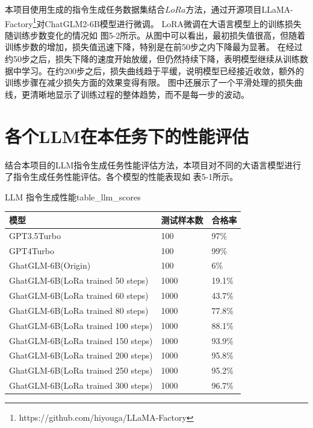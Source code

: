 \documentclass[a4paper,AutoFakeBold,oneside,12pt]{book}
\begin{document}
本项目使用生成的指令生成任务数据集结合$LoRa$方法，通过开源项目LLaMA-Factory\footnote{https://github.com/hiyouga/LLaMA-Factory}对ChatGLM2-6B模型进行微调。
LoRA微调在大语言模型上的训练损失随训练步数变化的情况如 图5-2所示。从图中可以看出，最初损失值很高，但随着训练步数的增加，损失值迅速下降，特别是在前50步之内下降最为显著。
在经过约50步之后，损失下降的速度开始放缓，但仍然持续下降，表明模型继续从训练数据中学习。在约200步之后，损失曲线趋于平缓，说明模型已经接近收敛，额外的训练步骤在减少损失方面的效果变得有限。
图中还展示了一个平滑处理的损失曲线，更清晰地显示了训练过程的整体趋势，而不是每一步的波动。

\section{各个LLM在本任务下的性能评估}
结合本项目的LLM指令生成任务性能评估方法，本项目对不同的大语言模型进行了指令生成任务性能评估。各个模型的性能表现如 表5-1所示。
\begin{bupttable}{LLM 指令生成性能}{table_llm_scores}
    \begin{tabular}{|l|l|l|}
        \hline \textbf{模型} & \textbf{测试样本数} & \textbf{合格率} \\
        \hline GPT3.5Turbo & 100 & 97\% \\
        \hline GPT4Turbo & 100 & 99\% \\
        \hline GhatGLM-6B(Origin) & 100 & 6\% \\
        \hline GhatGLM-6B(LoRa trained 50 steps) & 1000 & 19.1\% \\
        \hline GhatGLM-6B(LoRa trained 60 steps) & 1000 & 43.7\% \\
        \hline GhatGLM-6B(LoRa trained 80 steps) & 1000 & 77.8\% \\
        \hline GhatGLM-6B(LoRa trained 100 steps) & 1000 & 88.1\% \\
        \hline GhatGLM-6B(LoRa trained 150 steps) & 1000 & 93.9\% \\
        \hline GhatGLM-6B(LoRa trained 200 steps) & 1000 & 95.8\% \\
        \hline GhatGLM-6B(LoRa trained 250 steps) & 1000 & 95.2\% \\
        \hline GhatGLM-6B(LoRa trained 300 steps) & 1000 & 96.7\% \\
        \hline
    \end{tabular}
\end{bupttable}
\end{document}
